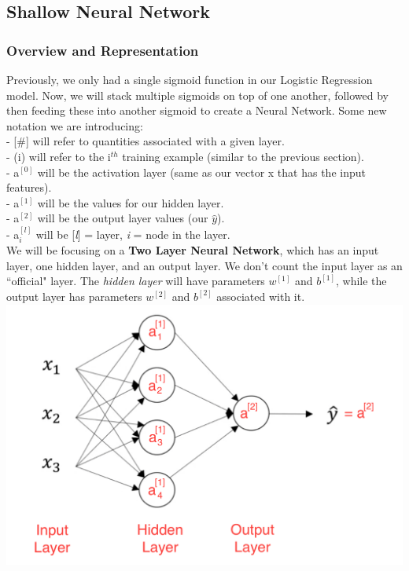 \documentclass[11pt, a4paper]{article}
\begin{document}
\begin{spacing}{1.1}
	\subsection{Shallow Neural Network}
	\subsubsection{Overview and Representation}
	Previously, we only had a single sigmoid function in our Logistic Regression model. Now, we will stack multiple sigmoids on top of one another, followed by then feeding these into another sigmoid to create a Neural Network. Some new notation we are introducing: \vspace*{1mm} \\
	\hspace*{3mm} - [\#] will refer to quantities associated with a given layer. \\
	\hspace*{3mm} - (i) will refer to the i$^{th}$ training example (similar to the previous section). \\
	\hspace*{3mm} - a$^{[0]}$ will be the activation layer (same as our vector x that has the input features). \\
	\hspace*{3mm} - a$^{[1]}$ will be the values for our hidden layer. \\
	\hspace*{3mm} - a$^{[2]}$ will be the output layer values (our $\hat{y}$). \\
	\hspace*{3mm} - a$^{[l]}_i$ will be [\textit{l}] = layer, \textit{i} = node in the layer. \vspace*{1mm} \\
	We will be focusing on a \textbf{Two Layer Neural Network}, which has an input layer, one hidden layer, and an output layer. We don't count the input layer as an ``official" layer. The \textit{hidden layer} will have parameters $w^{[1]}$ and $b^{[1]}$, while the output layer has parameters $w^{[2]}$ and $b^{[2]}$ associated with it. 
	\hspace*{16mm} \includegraphics[scale=.5]{NN_rep} 

\end{spacing}
\end{document}
